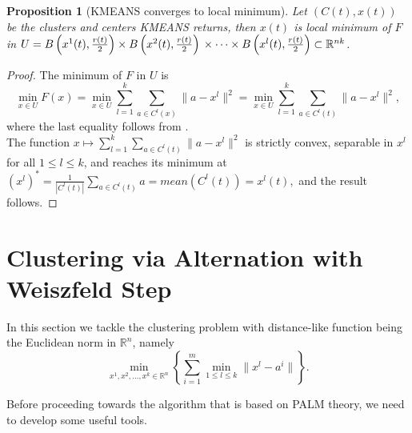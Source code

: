 \documentclass[11pt]{article}
\numberwithin{equation}{section}
\newtheorem{proposition}{Proposition}[section]
\begin{document}
\begin{proposition}[KMEANS converges to local minimum]
Let $(C(t), x(t))$ be the clusters and centers KMEANS returns, then $x(t)$ is local minimum of $F$ in $U = B\left( x^1(t),\frac{r(t)}{2}\right) \times  B\left( x^2(t),\frac{r(t)}{2}\right) \\ \times \cdots \times B\left( x^l(t),\frac{r(t)}{2} \right) \subset \mathbb{R}^{nk}$.
\end{proposition}

\begin{proof}
The minimum of $F$ in $U$ is
\begin{equation*}
\min\limits_{x \in U} F(x) = \min\limits_{x \in U} \sum\limits_{l=1}^{k} \sum\limits_{a \in C^l(x)} \|a - x^l \|^2 = \min\limits_{x \in U} \sum\limits_{l=1}^{k} \sum\limits_{a \in C^l(t)} \|a - x^l \|^2 ,
\end{equation*}
where the last equality follows from .\\
The function $x \mapsto \sum\limits_{l=1}^{k} \sum\limits_{a \in C^l(t)} \|a - x^l \|^2$ is strictly convex, separable in $x^l$ for all $1 \leq l \leq k$, and reaches its minimum at $\left( x^l \right)^{*} = \frac{1}{\left| C^l(t) \right|} \sum\limits_{a \in C^l(t)} a = mean(C^l(t)) = x^l(t),$ and the result follows.
\end{proof}

\section{Clustering via Alternation with Weiszfeld Step}

In this section we tackle the clustering problem with distance-like function being the Euclidean norm in $\mathbb{R}^n$, namely
\begin{equation}
	\min_{x^1, x^2, \ldots, x^k \in \mathbb{R}^n} \left\lbrace \sum\limits_{i=1}^{m} \min\limits_{1 \leq l \leq k} \|x^l - a^i\| \right\rbrace . \label{StateEq30}
\end{equation}

Before proceeding towards the algorithm that is based on PALM theory, we need to develop some useful tools.
\end{document}
